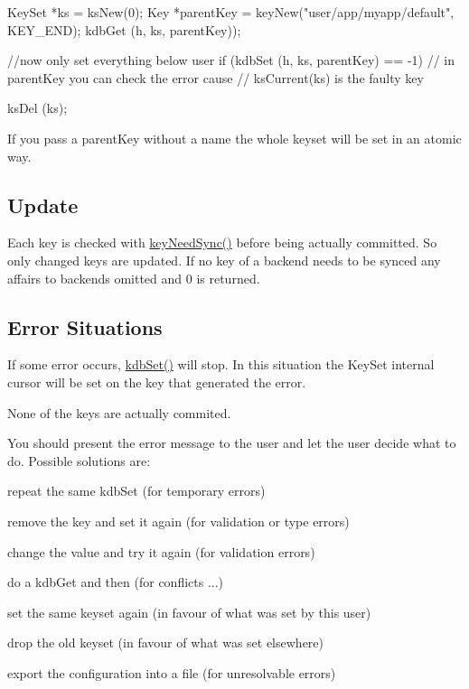 \begin{DoxyCode}
KeySet *ks = ksNew(0);
Key *parentKey = keyNew("user/app/myapp/default", KEY_END);
kdbGet (h, ks, parentKey));

//now only set everything below user
if (kdbSet (h, ks, parentKey) == -1)
{
        // in parentKey you can check the error cause
        // ksCurrent(ks) is the faulty key
}

ksDel (ks);
\end{DoxyCode}


If you pass a parentKey without a name the whole keyset will be set in an atomic way.\hypertarget{group__kdb_kdbsetupdate}{}\subsection{Update}\label{group__kdb_kdbsetupdate}
Each key is checked with \hyperlink{group__keytest_gaf247df0de7aca04b32ef80e39ef12950}{keyNeedSync()} before being actually committed. So only changed keys are updated. If no key of a backend needs to be synced any affairs to backends omitted and 0 is returned.\hypertarget{group__kdb_kdbseterror}{}\subsection{Error Situations}\label{group__kdb_kdbseterror}
If some error occurs, \hyperlink{group__kdb_ga11436b058408f83d303ca5e996832bcf}{kdbSet()} will stop. In this situation the KeySet internal cursor will be set on the key that generated the error.

None of the keys are actually commited.

You should present the error message to the user and let the user decide what to do. Possible solutions are:
\begin{DoxyItemize}
\item repeat the same kdbSet (for temporary errors)
\item remove the key and set it again (for validation or type errors)
\item change the value and try it again (for validation errors)
\item do a kdbGet and then (for conflicts ...)
\begin{DoxyItemize}
\item set the same keyset again (in favour of what was set by this user)
\item drop the old keyset (in favour of what was set elsewhere)
\end{DoxyItemize}
\item export the configuration into a file (for unresolvable errors)
\end{DoxyItemize}

